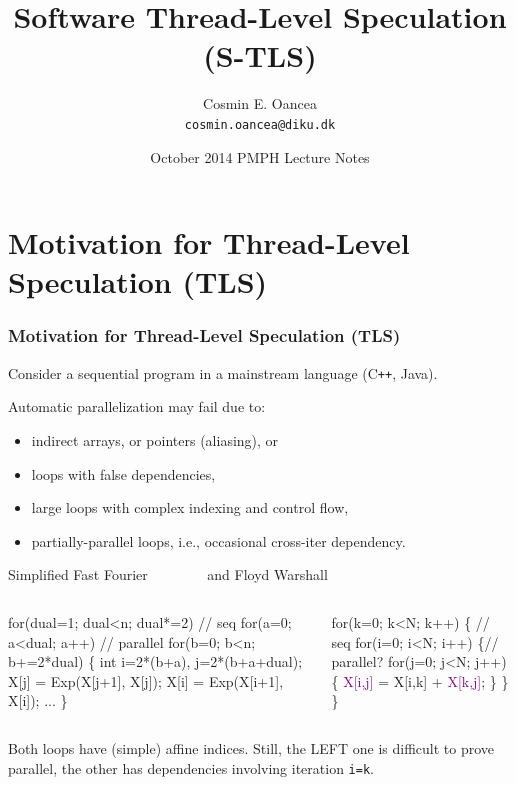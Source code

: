 \documentclass{beamer}
\title[S-TLS]{Software Thread-Level Speculation (S-TLS)}
\author[C.~Oancea]{Cosmin E. Oancea\\{\tt cosmin.oancea@diku.dk}}
\institute{Department of Computer Science (DIKU)\\University of Copenhagen}
\date[Oct'14]{October 2014 PMPH Lecture Notes}
\newcommand{\blue}[1]{\textcolor{Blue}{{#1}}}
\newcommand{\purple}[1]{\textcolor{Purple}{{#1}}}
\newcommand{\emp}[1]{\textcolor{DikuRed}{ #1}}
\newcommand{\emphh}[1]{\textcolor{CosGreen}{ #1}}
\newcommand{\mymath}[1]{$ #1 $}
\begin{document}
\titleslide




\begin{frame}[fragile]
	\tableofcontents
\end{frame}

\section{Motivation for Thread-Level Speculation (TLS)}

\begin{frame}[fragile,t]
  \frametitle{Motivation for Thread-Level Speculation (TLS)}

Consider a sequential program in a mainstream language (C{\tt ++}, Java).

\emp{Automatic parallelization may fail due to:}
\begin{itemize}
    \item indirect arrays, or pointers (aliasing), or
    \item loops with false dependencies,
    \item large loops with complex indexing and control flow,
    \item partially-parallel loops, 
            i.e., occasional cross-iter dependency.
\end  {itemize}\medskip

\begin{block}{Simplified Fast Fourier {\tt~~~~~~~} and Floyd Warshall}
\begin{columns}
\begin{colorcode}
for(dual=1; dual<n; dual*=2) // \emp{seq}
  for(a=0; a<dual; a++) // \emphh{parallel}
    for(b=0; b<n; b+=2*dual)      \{ 
      int i=2*(b+a), j=2*(b+a+dual); 
      X[j] = Exp(X[j+1], X[j]);  
      X[i] = Exp(X[i+1], X[i]); ... 
    \} 
\end{colorcode}
\begin{colorcode}
for(k=0; k<N; k++) \{  // \emp{seq}
  for(i=0; i<N; i++) \{// \emphh{parallel?}
    for(j=0; j<N; j++) \{
      \purple{X[i,j]} = X[i,k] + \purple{X[k,j]};
    \}
  \}
\}
\end{colorcode}
\end{columns}
\end{block} 

\emp{Both loops have (simple) affine indices. Still, the LEFT one
is difficult to prove parallel, the other has 
dependencies involving iteration {\tt i=k}.}

\end{frame}
\end{document}
